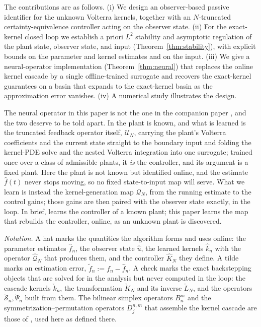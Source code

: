 \documentclass[journal,twoside,web]{ieeecolor}
\begin{document}
The contributions are as follows. (i) We design an observer-based passive identifier for the unknown Volterra kernels, together with an $N$-truncated certainty-equivalence controller acting on the observer state. (ii) For the exact-kernel closed loop we establish a priori $L^2$ stability and asymptotic regulation of the plant state, observer state, and input (Theorem~\ref{thm:stability}), with explicit bounds on the parameter and kernel estimates and on the input. (iii) We give a neural-operator implementation (Theorem~\ref{thm:neural}) that replaces the online kernel cascade by a single offline-trained surrogate and recovers the exact-kernel guarantees on a basin that expands to the exact-kernel basin as the approximation error vanishes. (iv) A numerical study illustrates the design.

The neural operator in this paper is not the one in the companion paper \cite{HV3}, and the two deserve to be told apart. In \cite{HV3} the plant is known, and what is learned is the truncated feedback operator itself, $\mathcal U_N$, carrying the plant's Volterra coefficients and the current state straight to the boundary input and folding the kernel-PDE solve and the nested Volterra integration into one surrogate; trained once over a class of admissible plants, it \emph{is} the controller, and its argument is a fixed plant. Here the plant is not known but identified online, and the estimate $\hat f(t)$ never stops moving, so no fixed state-to-input map will serve. What we learn is instead the kernel-generation map $\mathcal Q_N$, from the running estimate to the control gains; those gains are then paired with the observer state exactly, in the loop. In brief, \cite{HV3} learns the controller of a known plant; this paper learns the map that rebuilds the controller, online, as an unknown plant is discovered.

\emph{Notation.} A hat marks the quantities the algorithm forms and uses online: the parameter estimates $\hat f_n$, the observer state $\hat u$, the learned kernels $\hat k_n$ with the operator $\widehat{\mathcal Q}_N$ that produces them, and the controller $\hat K_N$ they define. A tilde marks an estimation error, $\tilde f_n:=f_n-\hat f_n$. A check marks the exact backstepping objects that are solved for in the analysis but never computed in the loop: the cascade kernels $\check k_n$, the transformation $\check K_N$ and its inverse $\check L_N$, and the operators $\check{\mathcal S}_n,\check\Psi_n$ built from them. The bilinear simplex operators $B^m_n$ and the symmetrization--permutation operators $D^{n,m}_j$ that assemble the kernel cascade are those of \cite{HV1}, used here as defined there.
\end{document}
